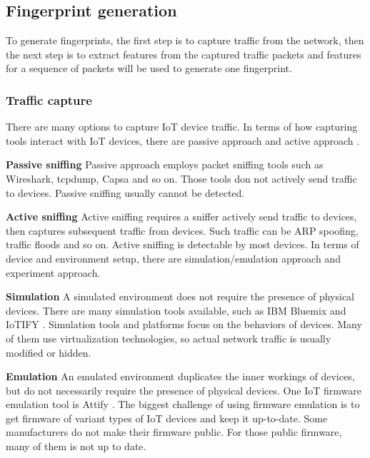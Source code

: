 \documentclass[twocolumn,10pt]{article}
\begin{document}
\subsection{Fingerprint generation}

To generate fingerprints, the first step is to capture traffic from the network, then the next step is to extract features from the captured traffic packets and features for a sequence of packets will be used to generate one fingerprint.

\subsubsection{Traffic capture}

There are many options to capture IoT device traffic. In terms of how capturing tools interact with IoT devices, there are passive approach and active approach \cite{free_hacking_articles}.

\textbf{Passive sniffing} Passive approach employs packet sniffing tools such as Wireshark, tcpdump, Capsa and so on. Those tools don not actively send traffic to devices. Passive sniffing usually cannot be detected.

\textbf{Active sniffing}  Active sniffing requires a sniffer actively send traffic to devices, then captures subsequent traffic from devices. Such traffic can be ARP spoofing, traffic floods and so on. Active sniffing is detectable by most devices.
\newline
\newline
In terms of device and environment setup, there are simulation/emulation approach and experiment approach.

\textbf{Simulation}
A simulated environment does not require the presence of physical devices. There are many simulation tools available, such as IBM Bluemix \cite{edprosser_2016} and IoTIFY \cite{rapid_iot_application_development}. Simulation tools and platforms focus on the behaviors of devices. Many of them use virtualization technologies, so actual network traffic is usually modified or hidden.

\textbf{Emulation}
An emulated environment duplicates the inner workings of devices, but do not necessarily require the presence of physical devices. One IoT firmware emulation tool is Attify \cite{attify_iot_and_mobile_security}. The biggest challenge of using firmware emulation is to get firmware of variant types of IoT devices and keep it up-to-date. Some manufacturers do not make their firmware public. For those public firmware, many of them is not up to date.
\end{document}

